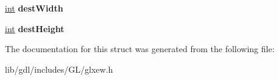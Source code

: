 \begin{DoxyCompactItemize}
\item 
\hypertarget{struct_g_l_x_pipe_rect_a3c07991d2a8fb6e973eae834650b3dad}{}\hyperlink{_s_d_l__thread_8h_a6a64f9be4433e4de6e2f2f548cf3c08e}{int} {\bfseries dest\+Width}\label{struct_g_l_x_pipe_rect_a3c07991d2a8fb6e973eae834650b3dad}

\item 
\hypertarget{struct_g_l_x_pipe_rect_a858b0ea6642e451495aff35cfefbd083}{}\hyperlink{_s_d_l__thread_8h_a6a64f9be4433e4de6e2f2f548cf3c08e}{int} {\bfseries dest\+Height}\label{struct_g_l_x_pipe_rect_a858b0ea6642e451495aff35cfefbd083}

\end{DoxyCompactItemize}


The documentation for this struct was generated from the following file\+:\begin{DoxyCompactItemize}
\item 
lib/gdl/includes/\+G\+L/glxew.\+h\end{DoxyCompactItemize}
